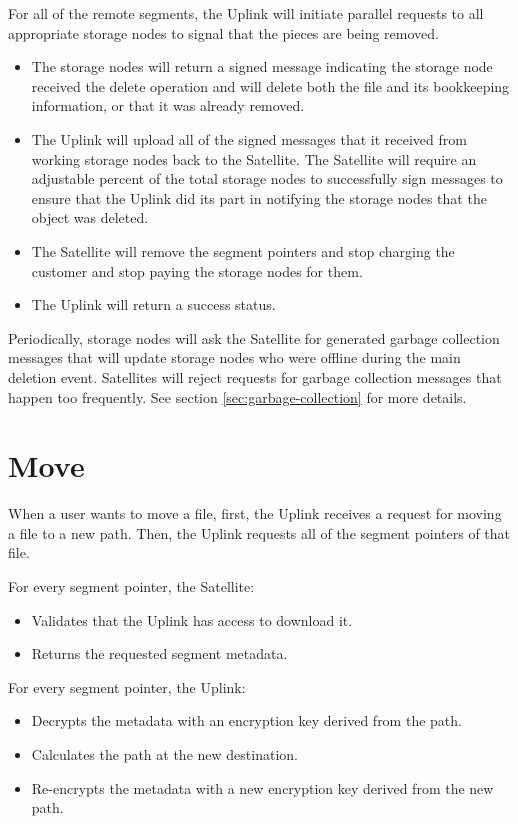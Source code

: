 \documentclass[8pt,fleqn,openany]{book}
\begin{document}
For all of the remote segments, the Uplink will
  initiate parallel requests to all appropriate storage nodes to signal that the
  pieces are being removed.

\begin{itemize}
\item The storage nodes will return a signed message indicating the storage node
received the
delete operation and will delete both the file and its bookkeeping information,
or that it was already removed.
\item The Uplink will upload all of the signed messages that it received from
  working storage nodes back to the Satellite. The Satellite will require an
  adjustable percent of the total storage nodes to successfully sign messages
  to ensure that the Uplink did its part in notifying the storage nodes that the
  object was deleted.
\item The Satellite will remove the segment pointers and stop charging the
  customer and stop paying the storage nodes for them.
\item The Uplink will return a success status.
\end{itemize}

Periodically, storage nodes will ask the Satellite for generated garbage
  collection messages that will update storage nodes who were offline during the
  main deletion event.
  Satellites will reject requests for garbage collection messages that
  happen too frequently. See section \ref{sec:garbage-collection} for more
  details.

\section{Move}

When a user wants to move a file,
first, the Uplink receives a request for moving a file to a new path.
Then, the Uplink requests all of the segment pointers of that file.

For every segment pointer, the Satellite:
  \begin{itemize}
  \item Validates that the Uplink has access to download it.
  \item Returns the requested segment metadata.
  \end{itemize}

For every segment pointer, the Uplink:
  \begin{itemize}
  \item Decrypts the metadata with an encryption key derived from the path.
  \item Calculates the path at the new destination.
  \item Re-encrypts the metadata with a new encryption key derived from the
    new path.
  \end{itemize}
\end{document}
